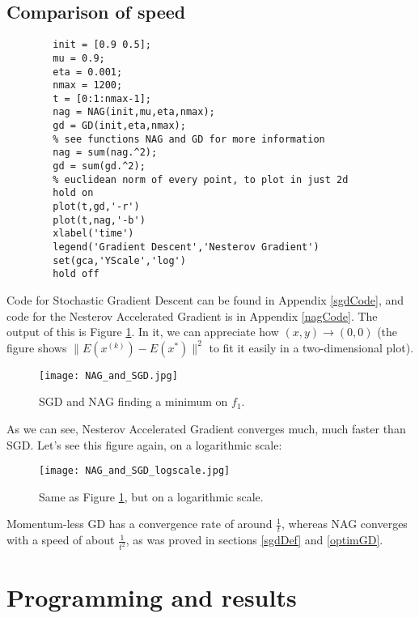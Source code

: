 \documentclass[titlepage]{article}
\theoremstyle{plain}
\theoremstyle{definition}
\begin{document}
		\subsection{Comparison of speed}\label{implementGD}
		\begin{verbatim}
		init = [0.9 0.5];
		mu = 0.9;
		eta = 0.001;
		nmax = 1200;
		t = [0:1:nmax-1];
		nag = NAG(init,mu,eta,nmax);
		gd = GD(init,eta,nmax);
		% see functions NAG and GD for more information
		nag = sum(nag.^2);
		gd = sum(gd.^2);
		% euclidean norm of every point, to plot in just 2d
		hold on
		plot(t,gd,'-r')
		plot(t,nag,'-b')
		xlabel('time')
		legend('Gradient Descent','Nesterov Gradient')
		set(gca,'YScale','log')
		hold off
		\end{verbatim}
		Code for Stochastic Gradient Descent can be found in Appendix \ref{sgdCode}, and code for the Nesterov Accelerated Gradient is in Appendix \ref{nagCode}.	The output of this is Figure \ref{fig:SGDandNAG}. In it, we can appreciate how $(x,y) \rightarrow (0,0)$ (the figure shows $\|E(x^{(k)}) - E(x^{\ast})\|^2$ to fit it easily in a two-dimensional plot).
		\begin{figure}[H]
			\centering
			\texttt{[image: NAG\_and\_SGD.jpg]}
			\caption{SGD and NAG finding a minimum on $f_1$.}
			\label{fig:SGDandNAG}
		\end{figure}
		As we can see, Nesterov Accelerated Gradient converges much, much faster than SGD. Let's see this figure again, on a logarithmic scale:
		\begin{figure}[H]
			\centering
			\texttt{[image: NAG\_and\_SGD\_logscale.jpg]}
			\caption{Same as Figure \ref{fig:SGDandNAG}, but on a logarithmic scale.}
			\label{fig:SGDandNAGlog}
		\end{figure}
		Momentum-less GD has a convergence rate of around $\frac{1}{t}$, whereas NAG converges with a speed of about $\frac{1}{t^2}$, as was proved in sections \ref{sgdDef} and \ref{optimGD}.
	\newpage
	\section{Programming and results} \label{Exper}
		
\end{document}
